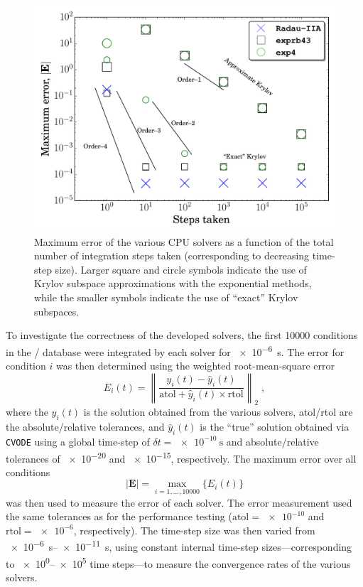 \documentclass[preprint,review,11pt]{elsarticle}
\begin{document}
\begin{figure}[htb]
  \centering
  \includegraphics[width=0.7\linewidth]{c_nco_nosmem_error.pdf}
  \caption{Maximum error of the various CPU solvers as a function of the total number of integration steps taken (corresponding to decreasing time-step size).
  Larger square and circle symbols indicate the use of Krylov subspace approximations with the exponential methods, while the smaller symbols indicate the use of ``exact'' Krylov subspaces.}
  \label{F:convergence}
 \end{figure}

To investigate the correctness of the developed solvers, the first \num{10000} conditions in the \slash{} database were integrated by each solver for \SI{e-6}{\second}.
The error for condition $i$ was then determined using the weighted root-mean-square error
\begin{equation}
 E_i(t) = \left\lVert\frac{y_i(t) - \hat{y}_i(t)}{\text{atol} + \hat{y}_i(t) \times \text{rtol}}\right\rVert_2 \;,
\end{equation}
where the $y_i(t)$ is the solution obtained from the various solvers, atol\slash rtol are the absolute\slash relative tolerances, and $\hat{y}_i(t)$ is the ``true'' solution obtained via \texttt{CVODE} using a global time-step of $\delta t = \SI{e-10}{\second}$ and absolute\slash relative tolerances of \num{e-20} and \num{e-15}, respectively.
The maximum error over all conditions
\begin{equation}
 \left\lvert\textbf{E}\right\rvert = \max_{i= 1, \dots, \num{10000}}\{E_i(t)\}
\end{equation}
was then used to measure the error of each solver.
The error measurement used the same tolerances as for the performance testing ($\text{atol} = \num{e-10}$ and $\text{rtol} = \num{e-6}$, respectively).
The time-step size was then varied from \SIrange{e-6}{e-11}{\second}, using constant internal time-step sizes---corresponding to \numrange[retain-zero-exponent]{e0}{e5} time steps---to measure the convergence rates of the various solvers.
\end{document}
